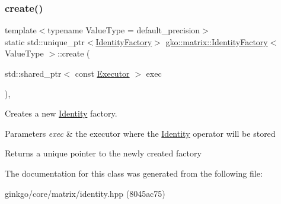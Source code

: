 \subsubsection{\texorpdfstring{create()}{create()}}
{\footnotesize\ttfamily template$<$typename Value\+Type  = default\+\_\+precision$>$ \\
static std\+::unique\+\_\+ptr$<$\hyperlink{classgko_1_1matrix_1_1IdentityFactory}{Identity\+Factory}$>$ \hyperlink{classgko_1_1matrix_1_1IdentityFactory}{gko\+::matrix\+::\+Identity\+Factory}$<$ Value\+Type $>$\+::create (\begin{DoxyParamCaption}\item[{std\+::shared\+\_\+ptr$<$ const \hyperlink{classgko_1_1Executor}{Executor} $>$}]{exec }\end{DoxyParamCaption})\hspace{0.3cm}{\ttfamily [inline]}, {\ttfamily [static]}}



Creates a new \hyperlink{classgko_1_1matrix_1_1Identity}{Identity} factory. 


\begin{DoxyParams}{Parameters}
{\em exec} & the executor where the \hyperlink{classgko_1_1matrix_1_1Identity}{Identity} operator will be stored\\
\hline
\end{DoxyParams}
\begin{DoxyReturn}{Returns}
a unique pointer to the newly created factory 
\end{DoxyReturn}


The documentation for this class was generated from the following file\+:\begin{DoxyCompactItemize}
\item 
ginkgo/core/matrix/identity.\+hpp (8045ac75)\end{DoxyCompactItemize}
